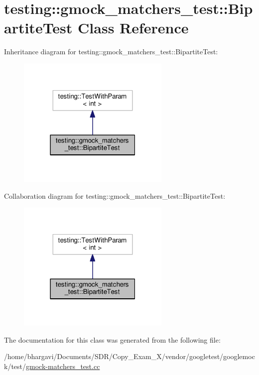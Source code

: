 \hypertarget{classtesting_1_1gmock__matchers__test_1_1_bipartite_test}{}\section{testing\+:\+:gmock\+\_\+matchers\+\_\+test\+:\+:Bipartite\+Test Class Reference}
\label{classtesting_1_1gmock__matchers__test_1_1_bipartite_test}


Inheritance diagram for testing\+:\+:gmock\+\_\+matchers\+\_\+test\+:\+:Bipartite\+Test\+:
\nopagebreak
\begin{figure}[H]
\begin{center}
\leavevmode
\includegraphics[width=207pt]{classtesting_1_1gmock__matchers__test_1_1_bipartite_test__inherit__graph}
\end{center}
\end{figure}


Collaboration diagram for testing\+:\+:gmock\+\_\+matchers\+\_\+test\+:\+:Bipartite\+Test\+:
\nopagebreak
\begin{figure}[H]
\begin{center}
\leavevmode
\includegraphics[width=207pt]{classtesting_1_1gmock__matchers__test_1_1_bipartite_test__coll__graph}
\end{center}
\end{figure}


The documentation for this class was generated from the following file\+:\begin{DoxyCompactItemize}
\item 
/home/bhargavi/\+Documents/\+S\+D\+R/\+Copy\+\_\+\+Exam\+\_\+X/vendor/googletest/googlemock/test/\hyperlink{gmock-matchers__test_8cc}{gmock-\/matchers\+\_\+test.\+cc}\end{DoxyCompactItemize}
